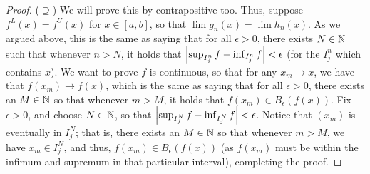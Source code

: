 \begin{proof}
($\supseteq$)
We will prove this by contrapositive too.
Thus, suppose $f^L(x) = f^U(x)$ for $x \in [a,b]$, so that $\lim g_n(x) = \lim h_n(x)$.
As we argued above, this is the same as saying that for all $\epsilon > 0$, there exists $N \in \mathbb{N}$ such that whenever $n > N$, it holds that $\left\lvert \sup_{I_j^n} f - \inf_{I_j^n} f\right\rvert < \epsilon$ (for the $I_j^n$ which contains $x$).
We want to prove $f$ is continuous, so that for any $x_m \to x$, we have that $f(x_m) \to f(x)$, which is the same as saying that for all $\epsilon > 0$, there exists an $M \in \mathbb{N}$ so that whenever $m > M$, it holds that $f(x_m) \in B_\epsilon(f(x))$.
Fix $\epsilon > 0$, and choose $N \in \mathbb{N}$, so that $\left\lvert \sup_{I_j^N} f - \inf_{I_j^N} f\right\rvert < \epsilon$.
Notice that $(x_m)$ is eventually in $I_j^N$;
that is, there exists an $M \in \mathbb{N}$ so that whenever $m > M$, we have $x_m \in I_j^N$, and thus, $f(x_m) \in B_\epsilon(f(x))$ (as $f(x_m)$ must be within the infimum and supremum in that particular interval), completing the proof.
\end{proof} 

